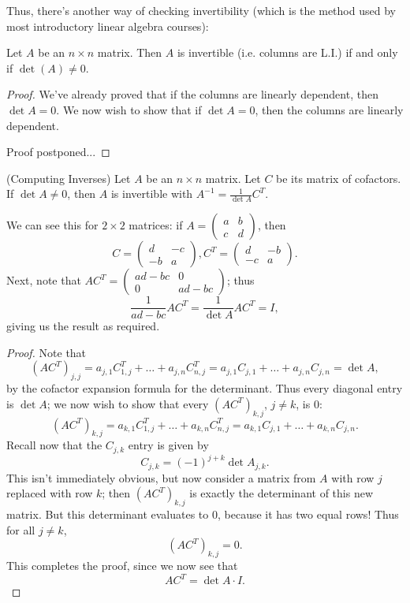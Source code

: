 \documentclass[math0540-lecture-notes.tex]{subfiles}
\begin{document}
Thus, there's another way of checking invertibility (which is the method used by most introductory
linear algebra courses):
\begin{proposition}{}
  Let $A$ be an $n\times n$ matrix. Then $A$ is invertible (i.e. columns are L.I.) if and only if
  $\det{(A)}\neq 0$.
\end{proposition}
\begin{proof}[Proof]
  We've already proved that if the columns are linearly dependent, then $\det{A}=0$. We now wish to
  show that if $\det{A}=0$, then the columns are linearly dependent. 

  Proof postponed...
\end{proof}

\begin{proposition}
  (Computing Inverses) Let $A$ be an $n\times n$ matrix. Let $C$ be its matrix of cofactors. 
  If $\det{A}\neq 0$, then $A$ is invertible with $A^{-1}=\frac{1}{\det{A}}C^T$.
\end{proposition}
We can see this for $2\times 2$ matrices: if $A=\begin{pmatrix} a&b\\c&d \end{pmatrix} $, then \[
  C = \begin{pmatrix} d&-c\\-b&a \end{pmatrix}, C^T = \begin{pmatrix} d&-b\\-c&a \end{pmatrix} 
.\] Next, note that $AC^T=\begin{pmatrix} ad-bc&0\\0&ad-bc \end{pmatrix} $; thus \[
  \frac{1}{ad-bc}AC^T=\frac{1}{\det{A}}AC^T=I
,\] giving us the result as required.

\begin{proof}[Proof]
  Note that
  \[
    (AC^T)_{j,j}=a_{j,1}C_{1,j}^T+\ldots+a_{j,n}C_{n,j}^T=a_{j,1}C_{j,1}+\ldots+a_{j,n}C_{j,n}=\det{A}
  ,\] by the cofactor expansion formula for the determinant. Thus every diagonal entry is $\det{A}$;
  we now wish to show that every $(AC^T)_{k,j}$, $j\neq k$, is $0$: \[
    (AC^T)_{k,j}=a_{k,1}C_{1,j}^T+\ldots+a_{k,n}C_{n,j}^T=a_{k,1}C_{j,1}+\ldots+a_{k,n}C_{j,n}
  .\] Recall now that the $C_{j,k}$ entry is given by \[
  C_{j,k}=(-1)^{j+k}\det{A_{j,k}}
  .\] This isn't immediately obvious, but now consider a matrix from $A$ with row $j$ replaced with
  row $k$; then $(AC^T)_{k,j}$ is exactly the determinant of this new matrix. But this determinant
  evaluates to $0$, because it has two equal rows! Thus for all $j\neq k$, \[
    (AC^T)_{k,j}=0
  .\] This completes the proof, since we now see that \[
    AC^T=\det{A}\cdot I
  .\] 
\end{proof}
\end{document}
